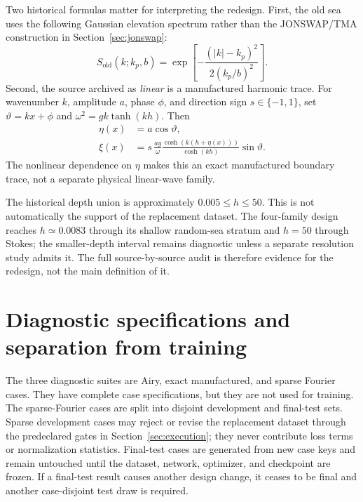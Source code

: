\documentclass[11pt]{article}
\begin{document}
Two historical formulas matter for interpreting the redesign.  First, the
old sea uses the following Gaussian elevation spectrum rather than the
JONSWAP/TMA construction in Section~\ref{sec:jonswap}:
\begin{equation}
  S_{\mathrm{old}}(k;k_p,b)
  =\exp\!\left[-\frac{(|k|-k_p)^2}{2(k_p/b)^2}\right].
  \label{eq:old-gaussian-spectrum}
\end{equation}
Second, the source archived as \emph{linear} is a manufactured harmonic
trace.  For wavenumber $k$, amplitude $a$, phase $\phi$, and direction sign
$s\in\{-1,1\}$, set $\vartheta=kx+\phi$ and
$\omega^2=gk\tanh(kh)$.  Then
\begin{align}
  \eta(x)&=a\cos\vartheta,\\
  \xi(x)&=s\,\frac{ag}{\omega}
    \frac{\cosh(k(h+\eta(x)))}{\cosh(kh)}\sin\vartheta.
  \label{eq:old-manufactured-xi}
\end{align}
The nonlinear dependence on $\eta$ makes this an exact manufactured
boundary trace, not a separate physical linear-wave family.

The historical depth union is approximately $0.005\leq h\leq50$.  This is
not automatically the support of the replacement dataset.  The four-family
design reaches $h\simeq0.0083$ through its shallow random-sea stratum and
$h=50$ through
Stokes; the smaller-depth interval remains diagnostic unless a separate
resolution study admits it.  The full source-by-source audit is therefore
evidence for the redesign, not the main definition of it.


\section{Diagnostic specifications and separation from training}
\label{sec:diagnostic-specifications}

The three diagnostic suites are Airy, exact manufactured, and sparse Fourier
cases.  They have complete case specifications, but they are not used for
training.  The sparse-Fourier cases are split into disjoint development and
final-test sets.
Sparse development cases may reject or revise the replacement dataset through the
predeclared gates in Section~\ref{sec:execution}; they never contribute loss
terms or normalization statistics.  Final-test cases are generated from new
case keys and remain untouched until the dataset, network, optimizer, and
checkpoint are frozen.  If a final-test result causes another design change,
it ceases to be final and another case-disjoint test draw is required.
\end{document}
